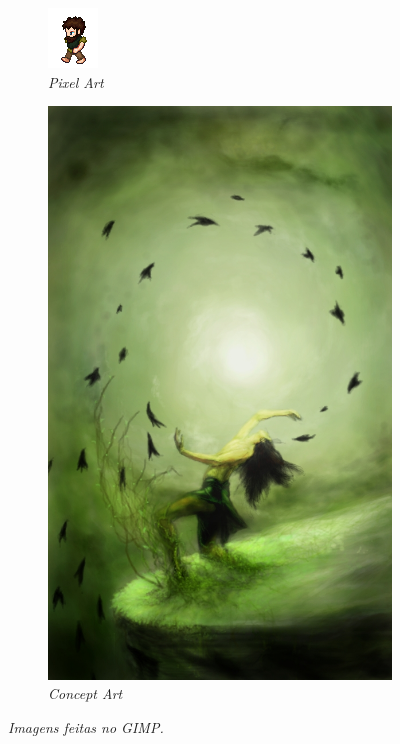 \documentclass[12pt,onecolumn]{article}
\begin{document}
  \begin{figure}[ht]
    \centering
    \begin{subfigure}{.5\textwidth}
      \centering
      \includegraphics[width=.7\linewidth]{screenshots/00-pixel_art.png}
      \caption{
        \footnotesize
        \it
        Pixel Art
      }
    \end{subfigure}%
    \begin{subfigure}{.5\textwidth}
      \centering
      \includegraphics[width=.7\linewidth]{screenshots/Dance_of_Rebirth_by_shiroikuro.jpg}
      \caption{
        \footnotesize
        \it
        Concept Art
      }
    \end{subfigure}
    \caption{
      \footnotesize
      \it
      Imagens feitas no GIMP.
    }
  \end{figure}
\end{document}
